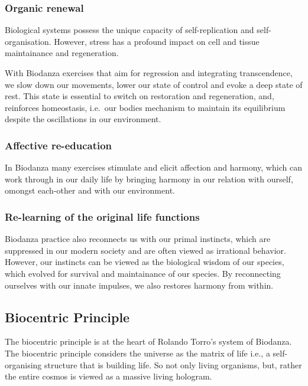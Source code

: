 \documentclass[
]{article}
\begin{document}
\hypertarget{organic-renewal}{%
\subsubsection{Organic renewal}\label{organic-renewal}}

Biological systems possess the unique capacity of self-replication and self-organisation. However, stress has a profound impact on cell and tissue maintainance and regeneration.

With Biodanza exercises that aim for regression and integrating transcendence, we slow down our movements, lower our state of control and evoke a deep state of rest. This state is essential to switch on restoration and regeneration, and, reinforces homeostasis, i.e.~our bodies mechanism to maintain its equilibrium despite the oscillations in our environment.

\hypertarget{affective-re-education}{%
\subsubsection{Affective re-education}\label{affective-re-education}}

In Biodanza many exercises stimulate and elicit affection and harmony, which can work through in our daily life by bringing harmony in our relation with ourself, omongst each-other and with our environment.

\hypertarget{re-learning-of-the-original-life-functions}{%
\subsubsection{Re-learning of the original life functions}\label{re-learning-of-the-original-life-functions}}

Biodanza practice also reconnects us with our primal instincts, which are suppressed in our modern society and are often viewed as irrational behavior.
However, our instincts can be viewed as the biological wisdom of our species, which evolved for survival and maintainance of our species. By reconnecting ourselves with our innate impulses, we also restores harmony from within.

\hypertarget{biocentric-principle}{%
\subsection{Biocentric Principle}\label{biocentric-principle}}

The biocentric principle is at the heart of Rolando Torro's system of Biodanza. The biocentric principle considers the universe as the matrix of life i.e., a self-organising structure that is building life. So not only living organisms, but, rather the entire cosmos is viewed as a massive living hologram.
\end{document}
